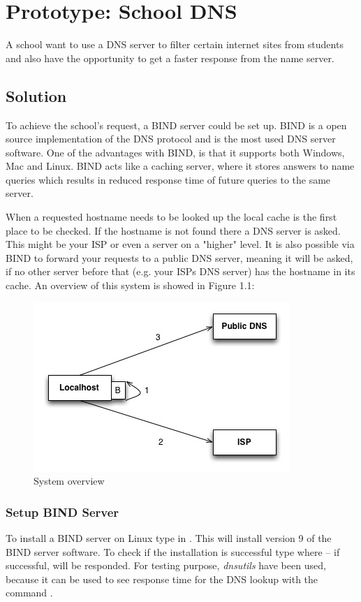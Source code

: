 \documentclass[Main]{subfiles}
\begin{document}
\chapter{Prototype: School DNS}
A school want to use a DNS server to filter certain internet sites from students and also have the opportunity to get a faster response from the name server. 

\section{Solution}
To achieve the school's request, a BIND server could be set up. 
BIND is a open source implementation of the DNS protocol and is the most used DNS server software. 
One of the advantages with BIND, is that it supports both Windows, Mac and Linux. 
BIND acts like a caching server, where it stores answers to name queries which results in reduced response time of future queries to the same server.

When a requested hostname needs to be looked up the local cache is the first place to be checked. 
If the hostname is not found there a DNS server is asked. 
This might be your ISP or even a server on a "higher" level. 
It is also possible via BIND to forward your requests to a public DNS server, meaning it will be asked, if no other server before that (e.g. your ISPs DNS server) has the hostname in its cache. An overview of this system is showed in Figure 1.1:

\begin{figure}[H]
\centering
\includegraphics[scale=0.5]{../../Protoypes/DNS/ForwardingDiagram.jpg}
\caption{System overview}
\label{fig:Forwarding}
\end{figure}


\subsection{Setup BIND Server}
To install a BIND server on Linux type in . This will install version 9 of the BIND server software. To check if the installation is successful type  where -- if successful,  will be responded. 
For testing purpose, \textit{dnsutils} have been used, because it can be used to see response time for the DNS lookup with the command .
\end{document}
